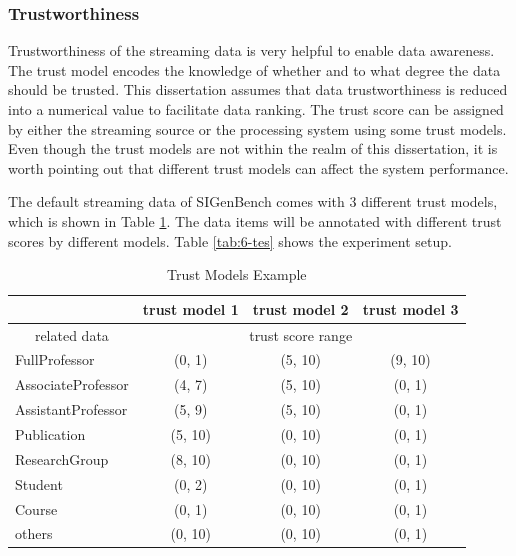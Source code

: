 \subsubsection{Trustworthiness}
Trustworthiness of the streaming data is very helpful to enable data awareness. 
The trust model encodes the knowledge of whether and to what degree the data should be trusted.
This dissertation assumes that data trustworthiness is reduced into a numerical value to facilitate data ranking.
The trust score can be assigned by either the streaming source or the processing system using some trust models. 
Even though the trust models are not within the realm of this dissertation, it is worth pointing out that different trust models can affect the system performance. 

The default streaming data of SIGenBench comes with 3 different trust models, which is shown in Table \ref{tab:6-tme}.
The data items will be annotated with different trust scores by different models.
Table \ref{tab:6-tes} shows the experiment setup.

\begin{table}[!htbp]
	\centering
    \caption{Trust Models Example}
    \label{tab:6-tme}
    \begin{tabular}{|l||c|c|c|} \hline
    	& trust model 1 & trust model 2 & trust model 3 \\ \hline
     \multicolumn{1}{|c||}{related data} & \multicolumn{3}{c|}{trust score range} \\ \hhline{|=#=|=|=|}
     FullProfessor & (0, 1) & (5, 10) & (9, 10) \\ \hline
     AssociateProfessor & (4, 7) & (5, 10) & (0, 1) \\ \hline
     AssistantProfessor & (5, 9) & (5, 10) & (0, 1) \\ \hline
     Publication & (5, 10) & (0, 10) & (0, 1) \\ \hline
     ResearchGroup & (8, 10) & (0, 10) & (0, 1) \\ \hline
     Student & (0, 2) & (0, 10) & (0, 1) \\ \hline
     Course & (0, 1) & (0, 10) & (0, 1) \\ \hline
     others & (0, 10) & (0, 10) & (0, 1) \\ \hline    
    \end{tabular}
\end{table} 

